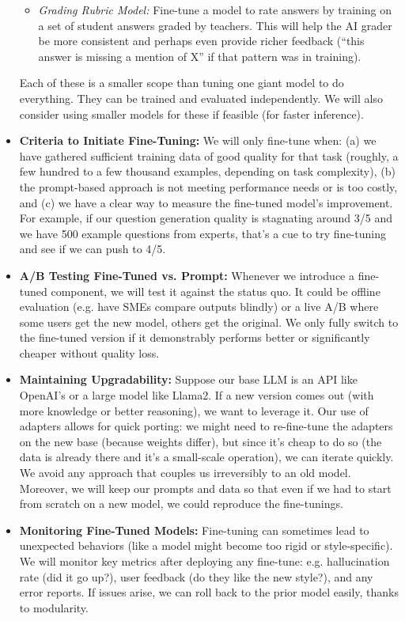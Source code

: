 \documentclass[11pt]{article}
\begin{document}
\begin{itemize}
\begin{itemize}
      \item \textit{Grading Rubric Model:} Fine-tune a model to rate answers by training on a set of student answers graded by teachers. This will help the AI grader be more consistent and perhaps even provide richer feedback (“this answer is missing a mention of X” if that pattern was in training).
    \end{itemize}
    Each of these is a smaller scope than tuning one giant model to do everything. They can be trained and evaluated independently. We will also consider using smaller models for these if feasible (for faster inference).
  \item \textbf{Criteria to Initiate Fine-Tuning:} We will only fine-tune when: (a) we have gathered sufficient training data of good quality for that task (roughly, a few hundred to a few thousand examples, depending on task complexity), (b) the prompt-based approach is not meeting performance needs or is too costly, and (c) we have a clear way to measure the fine-tuned model’s improvement. For example, if our question generation quality is stagnating around 3/5 and we have 500 example questions from experts, that’s a cue to try fine-tuning and see if we can push to 4/5.
  \item \textbf{A/B Testing Fine-Tuned vs. Prompt:} Whenever we introduce a fine-tuned component, we will test it against the status quo. It could be offline evaluation (e.g. have SMEs compare outputs blindly) or a live A/B where some users get the new model, others get the original. We only fully switch to the fine-tuned version if it demonstrably performs better or significantly cheaper without quality loss.
  \item \textbf{Maintaining Upgradability:} Suppose our base LLM is an API like OpenAI’s or a large model like Llama2. If a new version comes out (with more knowledge or better reasoning), we want to leverage it. Our use of adapters allows for quick porting: we might need to re-fine-tune the adapters on the new base (because weights differ), but since it’s cheap to do so (the data is already there and it’s a small-scale operation), we can iterate quickly. We avoid any approach that couples us irreversibly to an old model. Moreover, we will keep our prompts and data so that even if we had to start from scratch on a new model, we could reproduce the fine-tunings.
  \item \textbf{Monitoring Fine-Tuned Models:} Fine-tuning can sometimes lead to unexpected behaviors (like a model might become too rigid or style-specific). We will monitor key metrics after deploying any fine-tune: e.g. hallucination rate (did it go up?), user feedback (do they like the new style?), and any error reports. If issues arise, we can roll back to the prior model easily, thanks to modularity.

\end{itemize}
\end{document}
